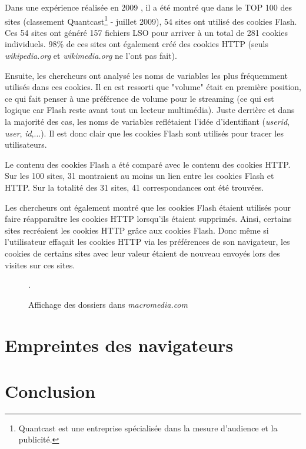 Dans une expérience réalisée en 2009 \cite{conf/aaaiss/SoltaniCMTH10}, il a été montré que dans le TOP 100 des sites (classement Quantcast\footnote{Quantcast est une entreprise spécialisée dans la mesure d'audience et la publicité.} - juillet 2009), 54 sites ont utilisé des cookies Flash. Ces 54 sites ont généré 157 fichiers LSO pour arriver à un total de 281 cookies individuels. 98\% de ces sites ont également créé des cookies HTTP (seuls \textit{wikipedia.org} et \textit{wikimedia.org} ne l'ont pas fait).

Ensuite, les chercheurs ont analysé les noms de variables les plus fréquemment utilisés dans ces cookies. Il en est ressorti que "volume" était en première position, ce qui fait penser à une préférence de volume pour le streaming (ce qui est logique car Flash reste avant tout un lecteur multimédia). Juste derrière et dans la majorité des cas, les noms de variables reflétaient l'idée d'identifiant (\textit{userid}, \textit{user}, \textit{id},...). Il est donc clair que les cookies Flash sont utilisés pour tracer les utilisateurs.

Le contenu des cookies Flash a été comparé avec le contenu des cookies HTTP. Sur les 100 sites, 31 montraient au moins un lien entre les cookies Flash et HTTP. Sur la totalité des 31 sites, 41 correspondances ont été trouvées.

Les chercheurs ont également montré que les cookies Flash étaient utilisés pour faire réapparaître les cookies HTTP lorsqu'ils étaient supprimés. Ainsi, certains sites recréaient les cookies HTTP grâce aux cookies Flash. Donc même si l'utilisateur effaçait les cookies HTTP via les préférences de son navigateur, les cookies de certains sites avec leur valeur étaient de nouveau envoyés lors des visites sur ces sites.

\begin{figure}[h]
	\centering
	
	\caption{\label{ls_macromedia.com}Affichage des dossiers dans \textit{macromedia.com}}.
\end{figure}

\section{Empreintes des navigateurs}
\label{fingerprinters}



\section{Conclusion}
